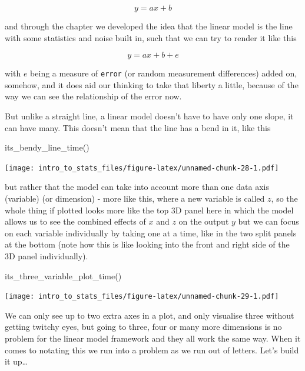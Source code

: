 \documentclass[
]{book}
\newenvironment{Shaded}{\begin{snugshade}}{\end{snugshade}}
\newcommand{\FunctionTok}[1]{\textcolor[rgb]{0.00,0.00,0.00}{#1}}
\newcommand{\NormalTok}[1]{#1}
\begin{document}
\begin{equation}
 y = ax + b
\end{equation}

and through the chapter we developed the idea that the linear model is the line with some statistics and noise built in, such that we can try to render it like this

\begin{equation}
 y = ax + b + e
\end{equation}

with \(e\) being a measure of \texttt{error} (or random measurement differences) added on, somehow, and it does aid our thinking to take that liberty a little, because of the way we can see the relationship of the error now.

But unlike a straight line, a linear model doesn't have to have only one slope, it can have many. This doesn't mean that the line has a bend in it, like this

\begin{Shaded}
\begin{Highlighting}[]
\FunctionTok{its\_bendy\_line\_time}\NormalTok{()}
\end{Highlighting}
\end{Shaded}

\texttt{[image: intro\_to\_stats\_files/figure-latex/unnamed-chunk-28-1.pdf]}

but rather that the model can take into account more than one data axis (variable) (or dimension) - more like this, where a new variable is called \(z\), so the whole thing if plotted looks more like the top 3D panel here in which the model allows us to see the combined effects of \(x\) and \(z\) on the output \(y\) but we can focus on each variable individually by taking one at a time, like in the two split panels at the bottom (note how this is like looking into the front and right side of the 3D panel individually).

\begin{Shaded}
\begin{Highlighting}[]
\FunctionTok{its\_three\_variable\_plot\_time}\NormalTok{()}
\end{Highlighting}
\end{Shaded}

\texttt{[image: intro\_to\_stats\_files/figure-latex/unnamed-chunk-29-1.pdf]}

We can only see up to two extra axes in a plot, and only visualise three without getting twitchy eyes, but going to three, four or many more dimensions is no problem for the linear model framework and they all work the same way. When it comes to notating this we run into a problem as we run out of letters. Let's build it up\ldots{}
\end{document}
